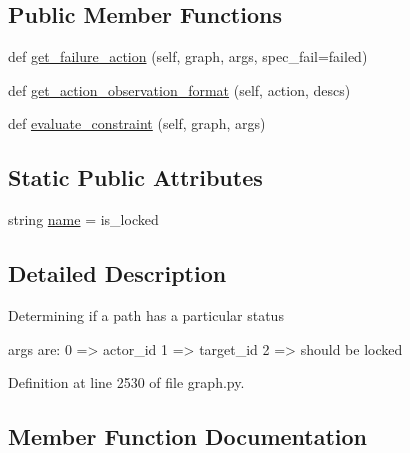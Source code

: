 \subsection*{Public Member Functions}
\begin{DoxyCompactItemize}
\item 
def \hyperlink{classlight__chats_1_1graph_1_1LockedConstraint_afd686dd0264132ac553f932d6670f8f1}{get\+\_\+failure\+\_\+action} (self, graph, args, spec\+\_\+fail=\textquotesingle{}failed\textquotesingle{})
\item 
def \hyperlink{classlight__chats_1_1graph_1_1LockedConstraint_aa0d083e42d50cfb65cde341edac6f32e}{get\+\_\+action\+\_\+observation\+\_\+format} (self, action, descs)
\item 
def \hyperlink{classlight__chats_1_1graph_1_1LockedConstraint_abfcbf9b599d27ffbe3061d5771dfdf9a}{evaluate\+\_\+constraint} (self, graph, args)
\end{DoxyCompactItemize}
\subsection*{Static Public Attributes}
\begin{DoxyCompactItemize}
\item 
string \hyperlink{classlight__chats_1_1graph_1_1LockedConstraint_a2685038006754564877b03277d436c7f}{name} = \textquotesingle{}is\+\_\+locked\textquotesingle{}
\end{DoxyCompactItemize}


\subsection{Detailed Description}
\begin{DoxyVerb}Determining if a path has a particular status

args are:
    0 => actor_id
    1 => target_id
    2 => should be locked
\end{DoxyVerb}
 

Definition at line 2530 of file graph.\+py.



\subsection{Member Function Documentation}
\mbox{\label{classlight__chats_1_1graph_1_1LockedConstraint_abfcbf9b599d27ffbe3061d5771dfdf9a}} 
